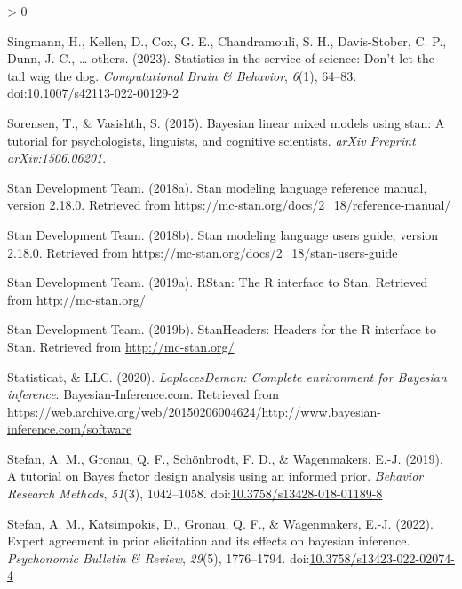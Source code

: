 \documentclass[
  english,
  doc,floatsintext]{apa6}
\newlength{\cslhangindent}
\newenvironment{CSLReferences}[2] %
 {%
  \setlength{\parindent}{0pt}
  \ifodd #1 \everypar{\setlength{\hangindent}{\cslhangindent}}\ignorespaces\fi
  \ifnum #2 > 0
  \setlength{\parskip}{#2\baselineskip}
  \fi
 }%
 {}
\begin{document}
\begin{CSLReferences}{1}{0}
\leavevmode\hypertarget{ref-singmann2023statistics}{}%
Singmann, H., Kellen, D., Cox, G. E., Chandramouli, S. H., Davis-Stober, C. P., Dunn, J. C., \ldots{} others. (2023). Statistics in the service of science: Don't let the tail wag the dog. \emph{Computational Brain \& Behavior}, \emph{6}(1), 64--83. doi:\href{https://doi.org/10.1007/s42113-022-00129-2}{10.1007/s42113-022-00129-2}

\leavevmode\hypertarget{ref-sorensen2015bayesian}{}%
Sorensen, T., \& Vasishth, S. (2015). Bayesian linear mixed models using stan: A tutorial for psychologists, linguists, and cognitive scientists. \emph{arXiv Preprint arXiv:1506.06201}.

\leavevmode\hypertarget{ref-stan2018b}{}%
Stan Development Team. (2018a). Stan modeling language reference manual, version 2.18.0. Retrieved from \url{https://mc-stan.org/docs/2_18/reference-manual/}

\leavevmode\hypertarget{ref-stan2018a}{}%
Stan Development Team. (2018b). Stan modeling language users guide, version 2.18.0. Retrieved from \url{https://mc-stan.org/docs/2_18/stan-users-guide}

\leavevmode\hypertarget{ref-R-rstan}{}%
Stan Development Team. (2019a). {RStan}: The {R} interface to {Stan}. Retrieved from \url{http://mc-stan.org/}

\leavevmode\hypertarget{ref-R-StanHeaders}{}%
Stan Development Team. (2019b). {StanHeaders}: Headers for the {R} interface to {Stan}. Retrieved from \url{http://mc-stan.org/}

\leavevmode\hypertarget{ref-R-LaplacesDemon}{}%
Statisticat, \& LLC. (2020). \emph{LaplacesDemon: Complete environment for {Bayesian} inference}. Bayesian-Inference.com. Retrieved from \url{https://web.archive.org/web/20150206004624/http://www.bayesian-inference.com/software}

\leavevmode\hypertarget{ref-stefan2019tutorial}{}%
Stefan, A. M., Gronau, Q. F., Schönbrodt, F. D., \& Wagenmakers, E.-J. (2019). A tutorial on {Bayes} factor design analysis using an informed prior. \emph{Behavior Research Methods}, \emph{51}(3), 1042--1058. doi:\href{https://doi.org/10.3758/s13428-018-01189-8}{10.3758/s13428-018-01189-8}

\leavevmode\hypertarget{ref-Stefan_etal2021}{}%
Stefan, A. M., Katsimpokis, D., Gronau, Q. F., \& Wagenmakers, E.-J. (2022). Expert agreement in prior elicitation and its effects on bayesian inference. \emph{Psychonomic Bulletin \& Review}, \emph{29}(5), 1776--1794. doi:\href{https://doi.org/10.3758/s13423-022-02074-4}{10.3758/s13423-022-02074-4}


\end{CSLReferences}
\end{document}
